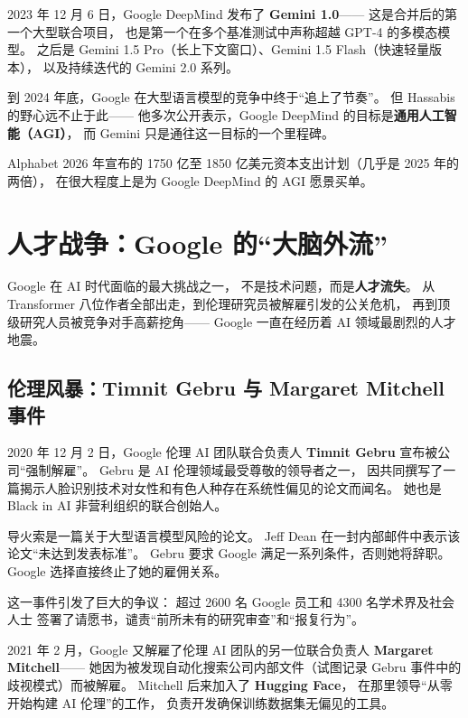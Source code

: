 2023 年 12 月 6 日，Google DeepMind 发布了 \textbf{Gemini 1.0}——
这是合并后的第一个大型联合项目，
也是第一个在多个基准测试中声称超越 GPT-4 的多模态模型。
之后是 Gemini 1.5 Pro（长上下文窗口）、Gemini 1.5 Flash（快速轻量版本），
以及持续迭代的 Gemini 2.0 系列。

到 2024 年底，Google 在大型语言模型的竞争中终于``追上了节奏''。
但 Hassabis 的野心远不止于此——
他多次公开表示，Google DeepMind 的目标是\textbf{通用人工智能（AGI）}，
而 Gemini 只是通往这一目标的一个里程碑。

Alphabet 2026 年宣布的 1750 亿至 1850 亿美元资本支出计划（几乎是 2025 年的两倍），
在很大程度上是为 Google DeepMind 的 AGI 愿景买单。


\section{人才战争：Google 的``大脑外流''}
\label{sec:brain-drain}

Google 在 AI 时代面临的最大挑战之一，
不是技术问题，而是\textbf{人才流失}。
从 Transformer 八位作者全部出走，到伦理研究员被解雇引发的公关危机，
再到顶级研究人员被竞争对手高薪挖角——
Google 一直在经历着 AI 领域最剧烈的人才地震。


\subsection{伦理风暴：Timnit Gebru 与 Margaret Mitchell 事件}
\label{subsec:ethics-crisis}

2020 年 12 月 2 日，Google 伦理 AI 团队联合负责人
\textbf{Timnit Gebru} 宣布被公司``强制解雇''。
Gebru 是 AI 伦理领域最受尊敬的领导者之一，
因共同撰写了一篇揭示人脸识别技术对女性和有色人种存在系统性偏见的论文而闻名。
她也是 Black in AI 非营利组织的联合创始人。

导火索是一篇关于大型语言模型风险的论文。
Jeff Dean 在一封内部邮件中表示该论文``未达到发表标准''。
Gebru 要求 Google 满足一系列条件，否则她将辞职。
Google 选择直接终止了她的雇佣关系。

这一事件引发了巨大的争议：
超过 2600 名 Google 员工和 4300 名学术界及社会人士
签署了请愿书，谴责``前所未有的研究审查''和``报复行为''。

2021 年 2 月，Google 又解雇了伦理 AI 团队的另一位联合负责人
\textbf{Margaret Mitchell}——
她因为被发现自动化搜索公司内部文件（试图记录 Gebru 事件中的歧视模式）而被解雇。
Mitchell 后来加入了 \textbf{Hugging Face}，
在那里领导``从零开始构建 AI 伦理''的工作，
负责开发确保训练数据集无偏见的工具。

